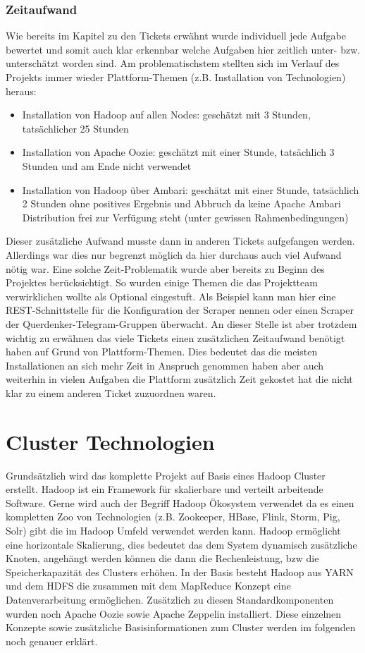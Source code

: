 \documentclass[12pt,oneside,a4paper,parskip]{scrbook}
\begin{document}
\subsection{Zeitaufwand}
Wie bereits im Kapitel zu den Tickets erw\"ahnt wurde individuell jede Aufgabe bewertet und somit auch klar erkennbar welche Aufgaben hier zeitlich unter- bzw. untersch\"atzt worden sind. Am problematischstem stellten sich im Verlauf des Projekts immer wieder Plattform-Themen (z.B. Installation von Technologien) heraus:
\begin{itemize}
	\item Installation von Hadoop auf allen Nodes: gesch\"atzt mit 3 Stunden, tats\"achlicher 25 Stunden
	\item Installation von Apache Oozie: gesch\"atzt mit einer Stunde, tats\"achlich 3 Stunden und am Ende nicht verwendet
	\item Installation von Hadoop \"uber Ambari: gesch\"atzt mit einer Stunde, tats\"achlich 2 Stunden ohne positives Ergebnis und Abbruch da keine Apache Ambari Distribution frei zur Verf\"ugung steht (unter gewissen Rahmenbedingungen)
\end{itemize}
Dieser zus\"atzliche Aufwand musste dann in anderen Tickets aufgefangen werden. Allerdings war dies nur begrenzt m\"oglich da hier durchaus auch viel Aufwand n\"otig war. \newline
Eine solche Zeit-Problematik wurde aber bereits zu Beginn des Projektes ber\"ucksichtigt. So wurden einige Themen die das Projektteam verwirklichen wollte als Optional eingestuft. Als Beispiel kann man hier eine REST-Schnittstelle f\"ur die Konfiguration der Scraper nennen oder einen Scraper der Querdenker-Telegram-Gruppen \"uberwacht. \newline
An dieser Stelle ist aber trotzdem wichtig zu erw\"ahnen das viele Tickets einen zus\"atzlichen Zeitaufwand ben\"otigt haben auf Grund von Plattform-Themen. Dies bedeutet das die meisten Installationen an sich mehr Zeit in Anspruch genommen haben aber auch weiterhin in vielen Aufgaben die Plattform zus\"atzlich Zeit gekostet hat die nicht klar zu einem anderen Ticket zuzuordnen waren.

\chapter{Cluster Technologien}
Grunds\"atzlich wird das komplette Projekt auf Basis eines Hadoop Cluster erstellt. Hadoop ist ein Framework f\"ur skalierbare und verteilt arbeitende Software. Gerne wird auch der Begriff  Hadoop \"Okosystem verwendet da es einen kompletten Zoo von Technologien (z.B. Zookeeper, HBase, Flink, Storm, Pig, Solr) gibt die im Hadoop Umfeld verwendet werden kann. Hadoop erm\"oglicht eine horizontale Skalierung, dies bedeutet das dem System dynamisch zus\"atzliche Knoten, angeh\"angt werden k\"onnen die dann die Rechenleistung, bzw die Speicherkapazit\"at des Clusters erh\"ohen. In der Basis besteht Hadoop aus YARN und dem HDFS die zusammen mit dem MapReduce Konzept eine Datenverarbeitung erm\"oglichen. Zus\"atzlich zu diesen Standardkomponenten wurden noch Apache Oozie sowie Apache Zeppelin installiert. Diese einzelnen Konzepte sowie zus\"atzliche Basisinformationen zum Cluster werden im folgenden noch genauer erkl\"art.
\end{document}
